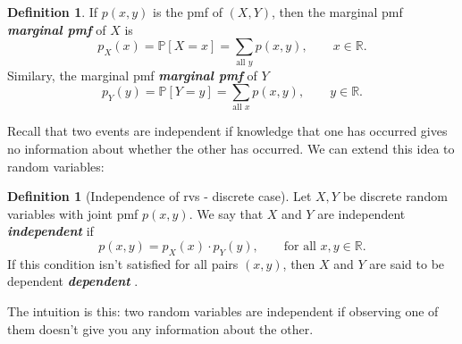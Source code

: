 \documentclass[10pt]{article}
\theoremstyle{definition}
\newtheorem{definition}[theorem]{Definition}
\newcommand{\1}[1]{\textbf{1}_{\left[#1\right]}} %
\def\R{\mathbb{R}} %
\def\P{\mathbb{P}} %
\DeclareRobustCommand{\demph}[1]{%
  \ifmmode
  {\color{Blue}#1}%
  \else
  {\color{Blue}\bfseries\slshape #1}%
  \fi
}
\begin{document}
\begin{definition}
  If $p(x,y)$ is the pmf of $(X,Y)$, then the \demph{marginal pmf} of $X$ is
  \begin{equation*}
    p_{X}(x)=  \P\left[X=x \right] = \sum_{\text{all }y}p(x,y), \qquad x\in \R.
  \end{equation*}
  Similary, the \demph{marginal pmf} of $Y$
  \begin{equation*}
    p_{Y}(y) = \P\left[Y = y \right] = \sum_{\text{all } x}p(x,y), \qquad y\in \R.
  \end{equation*}
\end{definition}
Recall that two events are independent if knowledge that one has occurred
gives no information about whether the other has occurred. We can extend this
idea to random variables:
\begin{definition}[Independence of rvs - discrete case]
  Let $X,Y$ be discrete random variables with joint pmf $p(x,y)$. We say that
  $X$ and $Y$ are \demph{independent} if 
  \begin{equation}\label{eq:independence-criteria-for-discrete-rv}
    p(x,y) = p_{X}(x)\cdot p_{Y}(y), \qquad \text{for all }x,y\in \R.
  \end{equation}
  If this condition isn't satisfied for all pairs $(x,y)$, then $X$ and $Y$
  are said to be \demph{dependent}.
\end{definition}

The intuition is this: two random variables are independent if observing one
of them doesn't give you any information about the other.
\end{document}
